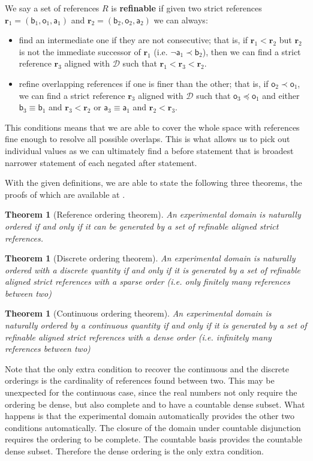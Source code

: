 \documentclass{article}
\def\NOT{\neg}
\newcommand{\stmt}[1][s] {\mathsf{#1}} %
\def\narrower{\preccurlyeq} %
\def\snarrower{\prec}
\newcommand{\edomain}[1][D] {\mathcal{#1}} %
\newcommand{\refStmt}[1][r]{\textbf{#1}}
\newtheorem{thrm}[equation]{Theorem}
\begin{document}
We say a set of references $R$ is \textbf{refinable} if given two strict references $\refStmt_1 = ( \stmt[b]_1, \stmt[o]_1, \stmt[a]_1)$ and $\refStmt_2 = ( \stmt[b]_2, \stmt[o]_2, \stmt[a]_2)$ we can always:
\begin{itemize}
	\item find an intermediate one if they are not consecutive; that is, if $\refStmt[r]_1 < \refStmt[r]_2$ but $\refStmt[r]_2$ is not the immediate successor of $\refStmt[r]_1$ (i.e. $\NOT \stmt[a]_1 \snarrower \stmt[b]_2$), then we can find a strict reference $\refStmt_3$ aligned with $\edomain$ such that $\refStmt[r]_1 < \refStmt[r]_3 < \refStmt[r]_2$.
	\item refine overlapping references if one is finer than the other; that is, if $\stmt[o]_2 \snarrower \stmt[o]_1$, we can find a strict reference $\refStmt_3$ aligned with $\edomain$ such that $\stmt[o]_3 \narrower \stmt[o]_1$ and either $\stmt[b]_3 \equiv \stmt[b]_1$ and $\refStmt_3 < \refStmt_2$ or $\stmt[a]_3 \equiv \stmt[a]_1$ and $\refStmt_2 < \refStmt_3$.
\end{itemize}
This conditions means that we are able to cover the whole space with references fine enough to resolve all possible overlaps. This is what allows us to pick out individual values as we can ultimately find a before statement that is broadest narrower statement of each negated after statement.

With the given definitions, we are able to state the following three theorems, the proofs of which are available at \cite{Carc3}.
\begin{thrm}[Reference ordering theorem]
	An experimental domain is naturally ordered if and only if it can be generated by a set of refinable aligned strict references.
\end{thrm}
\begin{thrm}[Discrete ordering theorem]
	An experimental domain is naturally ordered with a discrete quantity if and only if it is generated by a set of refinable aligned strict references with a sparse order (i.e. only finitely many references between two)
\end{thrm}
\begin{thrm}[Continuous ordering theorem]
	An experimental domain is naturally ordered by a continuous quantity if and only if it is generated by a set of refinable aligned strict references with a dense order (i.e. infinitely many references between two)
\end{thrm}

Note that the only extra condition to recover the continuous and the discrete orderings is the cardinality of references found between two. This may be unexpected for the continuous case, since the real numbers not only require the ordering be dense, but also complete and to have a countable dense subset. What happens is that the experimental domain automatically provides the other two conditions automatically. The closure of the domain under countable disjunction requires the ordering to be complete. The countable basis provides the countable dense subset. Therefore the dense ordering is the only extra condition.
\end{document}
